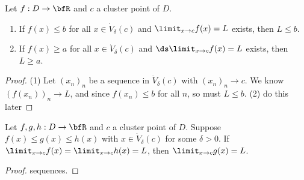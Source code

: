     \begin{theorem}
        Let $f:D \rightarrow \bfR$ and $c$ a cluster point of $D$.
        \begin{enumerate}[label = (\arabic*)]
            \item If $f(x) \leq b$ for all $x \in \dot{V}_\delta(c)$ and $\displaystyle \limit_{x\rightarrow c} f(x) = L$ exists, then $L \leq b$.
            \item If $f(x) \geq a$ for all $x \in \dot{V}_\delta(c)$ and $\ds \limit_{x \rightarrow c}f(x) = L$ exists, then $L \geq a$.
        \end{enumerate}
    \end{theorem}
        \begin{proof}
            (1) Let $(x_n)_n$ be a sequence in $\dot{V}_\delta(c)$ with $(x_n)_n \rightarrow c$. We know $(f(x_n))_n \rightarrow L$, and since $f(x_n) \leq b$ for all $n$, so must $L \leq b$.
            (2) {\color{red} do this later}
        \end{proof}

    \begin{theorem}
        Let $f,g,h:D \rightarrow \bfR$ and $c$ a cluster point of $D$. Suppose $f(x) \leq g(x) \leq h(x)$ with $x \in \dot{V}_\delta(c)$ for some $\delta > 0$. If $\limit_{x \rightarrow c}f(x) = \limit_{x \rightarrow c}h(x) = L$, then $\limit_{x \rightarrow c}g(x) = L$.
    \end{theorem}
        \begin{proof}
            {\color{red} sequences}.
        \end{proof}

